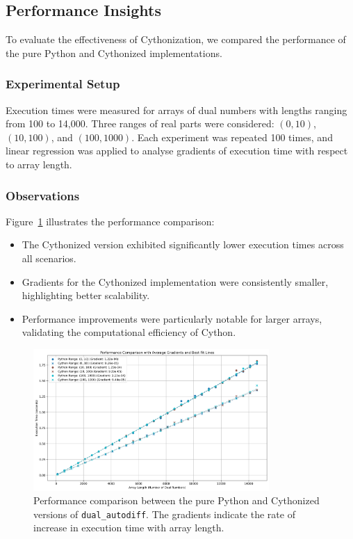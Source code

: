 \documentclass[a4paper,12pt]{article}
\begin{document}
\subsection{Performance Insights}
To evaluate the effectiveness of Cythonization, we compared the performance of the pure Python and Cythonized implementations.

\subsubsection{Experimental Setup}
Execution times were measured for arrays of dual numbers with lengths ranging from 100 to 14,000. Three ranges of real parts were considered: \((0,10)\), \((10,100)\), and \((100,1000)\). Each experiment was repeated 100 times, and linear regression was applied to analyse gradients of execution time with respect to array length.

\subsubsection{Observations}
Figure~\ref{fig:performance_comparison} illustrates the performance comparison:
\begin{itemize}
    \item The Cythonized version exhibited significantly lower execution times across all scenarios.
    \item Gradients for the Cythonized implementation were consistently smaller, highlighting better scalability.
    \item Performance improvements were particularly notable for larger arrays, validating the computational efficiency of Cython.
\end{itemize}

\begin{figure}[h!]
    \centering
    \includegraphics[width=0.8\textwidth]{performance_comparison.png}
    \caption{Performance comparison between the pure Python and Cythonized versions of \texttt{dual\_autodiff}. The gradients indicate the rate of increase in execution time with array length.}
    \label{fig:performance_comparison}
\end{figure}
\end{document}

